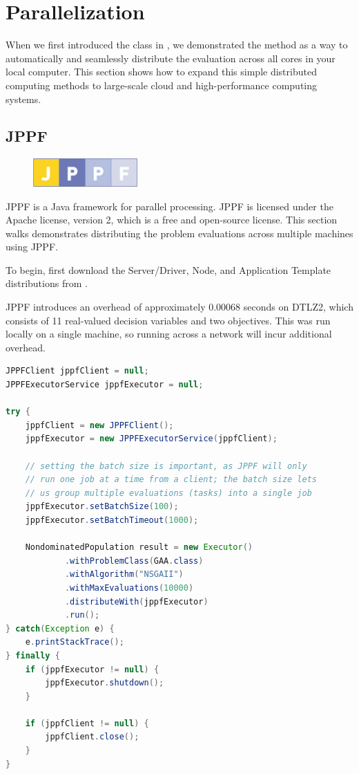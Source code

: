\chapter{Parallelization}
\label{chpt:parallelization}
When we first introduced the  class in , we demonstrated the  method as a way to automatically and seamlessly distribute the evaluation across all cores in your local computer.  This section shows how to expand this simple distributed computing methods to large-scale cloud and high-performance computing systems.

\section{JPPF}
\begin{figure}
  \includegraphics[width=4cm]{jppf.png}
\end{figure}
JPPF is a Java framework for parallel processing.  JPPF is licensed under the Apache license, version 2, which is a free and open-source license.  This section walks demonstrates distributing the problem evaluations across multiple machines using JPPF.

To begin, first download the Server/Driver, Node, and Application Template distributions from .  

JPPF introduces an overhead of approximately 0.00068 seconds on DTLZ2, which consists of 11 real-valued decision variables and two objectives.  This was run locally on a single machine, so running across a network will incur additional overhead.

\begin{lstlisting}[language=Java]
JPPFClient jppfClient = null;
JPPFExecutorService jppfExecutor = null;

try {
	jppfClient = new JPPFClient();
	jppfExecutor = new JPPFExecutorService(jppfClient);
		
	// setting the batch size is important, as JPPF will only
	// run one job at a time from a client; the batch size lets
	// us group multiple evaluations (tasks) into a single job
	jppfExecutor.setBatchSize(100);
	jppfExecutor.setBatchTimeout(1000);
	
	NondominatedPopulation result = new Executor()
			.withProblemClass(GAA.class)
			.withAlgorithm("NSGAII")
			.withMaxEvaluations(10000)
			.distributeWith(jppfExecutor)
			.run();
} catch(Exception e) {
	e.printStackTrace();
} finally {
	if (jppfExecutor != null) {
		jppfExecutor.shutdown();
	}
		
	if (jppfClient != null) {
		jppfClient.close();
	}
}
\end{lstlisting}